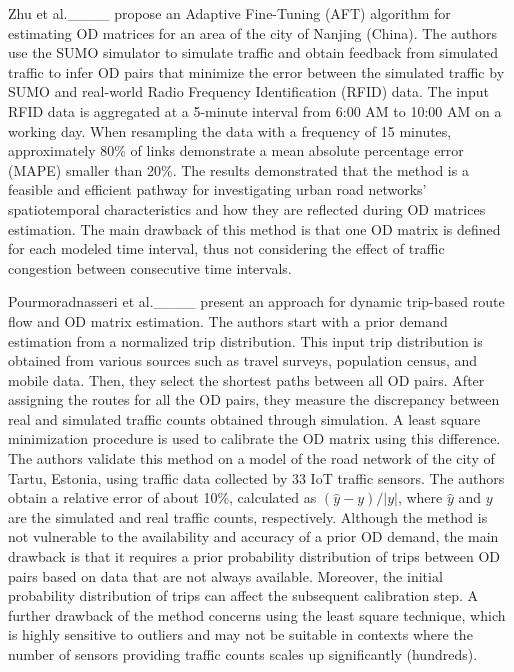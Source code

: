 Zhu et al.____ propose an Adaptive Fine-Tuning (AFT) algorithm for estimating OD matrices for an area of the city of Nanjing (China). The authors use the SUMO simulator to simulate traffic and obtain feedback from simulated traffic to infer OD pairs that minimize the error between the simulated traffic by SUMO and real-world Radio Frequency Identification (RFID) data. The input RFID data is aggregated at a 5-minute interval from 6:00 AM to 10:00 AM on a working day. When resampling the data with a frequency of 15 minutes, approximately 80\% of links demonstrate a mean absolute percentage error (MAPE) smaller than 20\%. The results demonstrated that the method is a feasible and efficient pathway for investigating urban road networks' spatiotemporal characteristics and how they are reflected during OD matrices estimation.
The main drawback of this method is that one OD matrix is defined for each modeled time interval, thus not considering the effect of traffic congestion between consecutive time intervals.

Pourmoradnasseri et al.____ present an approach for dynamic trip-based route flow and OD matrix estimation. The authors start with a prior demand estimation from a normalized trip distribution. This input trip distribution is obtained from various sources such as travel surveys, population census, and mobile data. Then, they select the shortest paths between all OD pairs. After assigning the routes for all the OD pairs, they measure the discrepancy between real and simulated traffic counts obtained through simulation. A least square minimization procedure is used to calibrate the OD matrix using this difference. The authors validate this method on a model of the road network of the city of Tartu, Estonia, using traffic data collected by 33 IoT traffic sensors. The authors obtain a relative error of about 10\%, calculated as ${(\hat{y}-y)}/{|y|}$, where $\hat{y}$ and $y$ are the simulated and real traffic counts, respectively. Although the method is not vulnerable to the availability and accuracy of a prior OD demand, the main drawback is that it requires a prior probability distribution of trips between OD pairs based on data that are not always available. Moreover, the initial probability distribution of trips can affect the subsequent calibration step. A further drawback of the method concerns using the least square technique, which is highly sensitive to outliers and may not be suitable in contexts where the number of sensors providing traffic counts scales up significantly (hundreds).

